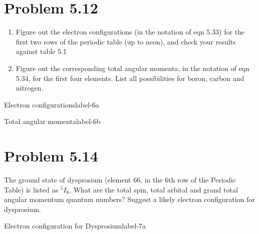 \documentclass[../main.tex]{subfiles}
\begin{document}
\section{Problem 5.12}

\begin{enumerate}
    \item Figure out the electron configurations (in the notation of eqn 5.33) for the first two rows of the periodic table (up to neon), and check your results against table 5.1
    \item Figure out the corresponding total angular momenta, in the notation of eqn 5.34, for the first four elements.
        List all possibilities for boron, carbon and nitrogen.
\end{enumerate}


\begin{sol}{Electron configurations}{label-6a}

\end{sol}

\begin{sol}{Total angular momenta}{label-6b}

\end{sol}


\section{Problem 5.14}

The ground state of dysprosium (element 66, in the 6th row of the Periodic Table) is listed as $^5I_8$.
What are the total spin, total arbital and grand total angular momentum quantum numbers?
Suggest a likely electron configuration for dysprosium.

\begin{sol}{Electron configuration for Dysprosium}{label-7a}

\end{sol}
\end{document}

